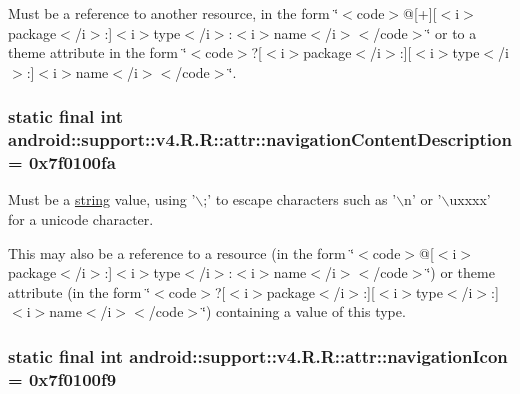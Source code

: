Must be a reference to another resource, in the form \char`\"{}$<$code$>$@\mbox{[}+\mbox{]}\mbox{[}$<$i$>$package$<$/i$>$:\mbox{]}$<$i$>$type$<$/i$>$:$<$i$>$name$<$/i$>$$<$/code$>$\char`\"{} or to a theme attribute in the form \char`\"{}$<$code$>$?\mbox{[}$<$i$>$package$<$/i$>$:\mbox{]}\mbox{[}$<$i$>$type$<$/i$>$:\mbox{]}$<$i$>$name$<$/i$>$$<$/code$>$\char`\"{}. \hypertarget{classandroid_1_1support_1_1v4_1_1_r_1_1attr_f1a94b0e5c71eea7e5a81523b13d4955}{
\subsubsection[{navigationContentDescription}]{\setlength{\rightskip}{0pt plus 5cm}static final int android::support::v4.R.R::attr::navigationContentDescription = 0x7f0100fa}}
\label{classandroid_1_1support_1_1v4_1_1_r_1_1attr_f1a94b0e5c71eea7e5a81523b13d4955}


Must be a \hyperlink{classandroid_1_1support_1_1v4_1_1_r_1_1string}{string} value, using '$\backslash$;' to escape characters such as '$\backslash$n' or '$\backslash$uxxxx' for a unicode character. 

This may also be a reference to a resource (in the form \char`\"{}$<$code$>$@\mbox{[}$<$i$>$package$<$/i$>$:\mbox{]}$<$i$>$type$<$/i$>$:$<$i$>$name$<$/i$>$$<$/code$>$\char`\"{}) or theme attribute (in the form \char`\"{}$<$code$>$?\mbox{[}$<$i$>$package$<$/i$>$:\mbox{]}\mbox{[}$<$i$>$type$<$/i$>$:\mbox{]}$<$i$>$name$<$/i$>$$<$/code$>$\char`\"{}) containing a value of this type. \hypertarget{classandroid_1_1support_1_1v4_1_1_r_1_1attr_baa6c26fb7c93f2886eae8898fbb0ffd}{
\subsubsection[{navigationIcon}]{\setlength{\rightskip}{0pt plus 5cm}static final int android::support::v4.R.R::attr::navigationIcon = 0x7f0100f9}}
\label{classandroid_1_1support_1_1v4_1_1_r_1_1attr_baa6c26fb7c93f2886eae8898fbb0ffd}


